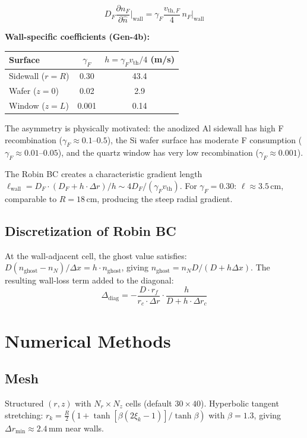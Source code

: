 \documentclass[11pt,a4paper]{article}
\begin{document}
\begin{equation}
\boxed{D_F\frac{\partial n_F}{\partial\hat{n}}\bigg|_{\mathrm{wall}} = \gamma_F\frac{v_{\mathrm{th},F}}{4}\,n_F\bigg|_{\mathrm{wall}}}
\end{equation}

\textbf{Wall-specific coefficients (Gen-4b):}
\begin{center}
\begin{tabular}{lcc}
\toprule
Surface & $\gamma_F$ & $h = \gamma_F v_{\mathrm{th}}/4$ (m/s) \\
\midrule
Sidewall ($r = R$) & 0.30 & 43.4 \\
Wafer ($z = 0$) & 0.02 & 2.9 \\
Window ($z = L$) & 0.001 & 0.14 \\
\bottomrule
\end{tabular}
\end{center}

The asymmetry is physically motivated: the anodized Al sidewall has high F recombination ($\gamma_F \approx 0.1$--$0.5$), the Si wafer surface has moderate F consumption ($\gamma_F \approx 0.01$--$0.05$), and the quartz window has very low recombination ($\gamma_F \approx 0.001$).

The Robin BC creates a characteristic gradient length $\ell_{\mathrm{wall}} = D_F\cdot(D_F + h\cdot\Delta r)/h \sim 4D_F/(\gamma_F v_{\mathrm{th}})$.  For $\gamma_F = 0.30$: $\ell \approx 3.5$\,cm, comparable to $R = 18$\,cm, producing the steep radial gradient.

\subsection{Discretization of Robin BC}

At the wall-adjacent cell, the ghost value satisfies:
$D(n_{\mathrm{ghost}} - n_N)/\Delta x = h \cdot n_{\mathrm{ghost}}$, giving $n_{\mathrm{ghost}} = n_N D/(D+h\Delta x)$.  The resulting wall-loss term added to the diagonal:
\begin{equation}
\Delta_{\mathrm{diag}} = -\frac{D\cdot r_f}{r_c\cdot\Delta r}\cdot\frac{h}{D+h\cdot\Delta r_c}
\end{equation}

\section{Numerical Methods}
\label{sec:numerics}

\subsection{Mesh}
Structured $(r,z)$ with $N_r \times N_z$ cells (default $30 \times 40$).  Hyperbolic tangent stretching: $r_k = \frac{R}{2}(1 + \tanh[\beta(2\xi_k-1)]/\tanh\beta)$ with $\beta = 1.3$, giving $\Delta r_{\min} \approx 2.4$\,mm near walls.
\end{document}
